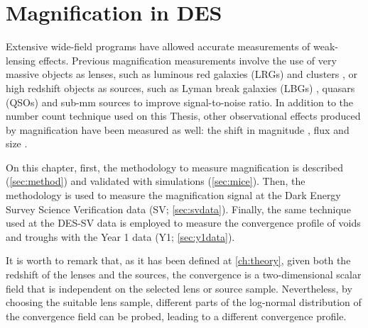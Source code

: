 \chapter{Magnification in DES}
\label{ch:magnification}

Extensive wide-field programs have allowed accurate measurements of weak-lensing effects. Previous magnification measurements involve the use of very massive objects as lenses, such as luminous red galaxies (LRGs) and clusters \cite{1995AIPC..336..320B,2014MNRAS.440.3701B,2014MNRAS.439.3755F,2016MNRAS.457.3050C}, or high redshift objects as sources, such as Lyman break galaxies (LBGs) \cite{2009A&A...507..683H,2012MNRAS.426.2489M}, quasars (QSOs) \cite{1979ApJ...227...30S,1989Natur.339..106H,1990A&A...240...11F,1993A&A...268....1B,2002A&A...386..784M,0004-637X-633-2-589} and sub-mm sources  \cite{2011MNRAS.414..596W} to improve signal-to-noise ratio. In addition to the number count technique used on this Thesis, other observational effects produced by magnification have been measured as well: the shift in magnitude \cite{2010MNRAS.405.1025M}, flux \cite{2011MNRAS.411.2113J} and size \cite{2041-8205-780-2-L16}.
\newline

On this chapter, first, the methodology to measure magnification is described (\autoref{sec:method}) and validated with simulations (\autoref{sec:mice}). Then, the methodology is used to measure the magnification signal at the Dark Energy Survey Science Verification data (SV; \autoref{sec:svdata}). Finally, the same technique used at the DES-SV data is employed to measure the convergence profile of voids and troughs with the Year 1 data (Y1; \autoref{sec:y1data}).
\newline

It is worth to remark that, as it has been defined at \autoref{ch:theory}, given both the redshift of the lenses and the sources, the convergence is a two-dimensional scalar field that is independent on the selected lens or source sample. Nevertheless, by choosing the suitable lens sample, different parts of the log-normal distribution of the convergence field \cite{2017MNRAS.466.1444C} can be probed, leading to a different convergence profile.

